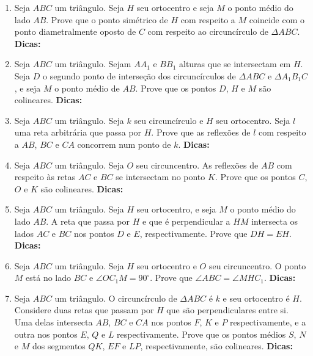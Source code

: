 \documentclass{article}
\newcommand{\dica}{\textbf{Dicas:}}
\newcommand{\iniTri}{Seja $ABC$ um triângulo}
\begin{document}
\begin{multicols}{2}
\begin{enumerate}
    \item \iniTri. Seja $H$ seu ortocentro e seja $M$ o ponto médio do lado $AB$. Prove que o ponto simétrico de $H$ com respeito a $M$ coincide com o ponto diametralmente oposto de $C$ com respeito ao circuncírculo de $\Delta ABC$. \dica %
    
    \item \iniTri. Sejam $AA_1$ e $BB_1$ alturas que se intersectam em $H$. Seja $D$ o segundo ponto de interseção dos circuncírculos de $\Delta ABC$ e $\Delta A_1B_1C$, e seja $M$ o ponto médio de $AB$. Prove que os pontos $D$, $H$ e $M$ são colineares. \dica %
    
    \item \iniTri. Seja $k$ seu circuncírculo e $H$ seu ortocentro. Seja $l$ uma reta arbitrária que passa por $H$. Prove que as reflexões de $l$ com respeito a $AB$, $BC$ e $CA$ concorrem num ponto de $k$. \dica %
    
    \item \iniTri. Seja $O$ seu circuncentro. As reflexões de $AB$ com respeito às retas $AC$ e $BC$ se intersectam no ponto $K$. Prove que os pontos $C$, $O$ e $K$ são colineares. \dica %
    
    \item \iniTri. Seja $H$ seu ortocentro, e seja $M$ o ponto médio do lado $AB$. A reta que passa por $H$ e que é perpendicular a $HM$ intersecta os lados $AC$ e $BC$ nos pontos $D$ e $E$, respectivamente. Prove que $DH=EH$. \dica %
    
    \item \iniTri. Seja $H$ seu ortocentro e $O$ seu circuncentro. O ponto $M$ está no lado $BC$ e $\angle OC_1M=90^{\circ}$. Prove que $\angle ABC=\angle MHC_1$. \dica %
    
    \item \iniTri. O circuncírculo de $\Delta ABC$ é $k$ e seu ortocentro é $H$. Considere duas retas que passam por $H$ que são perpendiculares entre si. Uma delas intersecta $AB$, $BC$ e $CA$ nos pontos $F$, $K$ e $P$ respectivamente, e a outra nos pontos $E$, $Q$ e $L$ respectivamente. Prove que os pontos médios $S$, $N$ e $M$ dos segmentos $QK$, $EF$ e $LP$, respectivamente, são colineares. \dica %
    

\end{enumerate}
\end{multicols}
\end{document}
